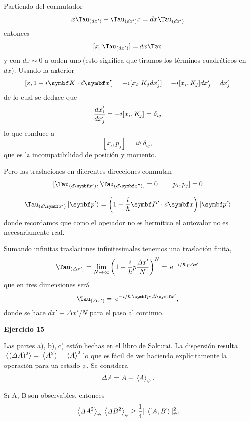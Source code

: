 \documentclass[10pt,oneside]{CBFT_book}
\begin{document}
Partiendo del conmutador 
\[
	x \Tau_{(dx')} - \Tau_{(dx')} x = dx \Tau_{(dx')}
\]
entonces 
\[
	[x, \Tau_{(dx')}] = dx\Tau 
\]
y con $dx\sim 0$ a orden uno (esto significa que tiramos los términos cuadráticos en $dx$).
Usando la anterior
\[
	[x, 1 - i \vb K \cdot d\vb{x'} ] = -i [ x_i, K_j dx_j' ] = 
	-i [ x_i, K_j ] dx_j' =  dx_j'
\]
de lo cual se deduce que
\[
	\frac{d^{\hspace{-0.05em}} {x_i'}}{d {x_j'}^{\hspace{-0.05em}}} = - i [ x_i , K_j ] = \delta_{ij}
\]
lo que conduce a 
\[
	[ x_i, p_j ] = i \hbar \:\delta_{ij},
\]
que es la incompatibilidad de posición y momento.

Pero las traslaciones en diferentes direcciones conmutan
\[
	[ \Tau_{(d\vb{x}')}, \Tau_{(d\vb{x}'')} ] = 0  \qquad [ p_i, p_j ] = 0
\]
	
\[
	\Tau_{(d\vb{x}')} \Ket{\vb{p'}} = 
	\left( 1 - \frac{i}{\hbar} \vb{P'}\cdot d\vb{x} \right) \Ket{\vb{p'}}
\]
donde recordamos que como el operador no es hermítico el autovalor no es 
necesariamente real.

Sumando infinitas traslaciones infinitesimales tenemos una traslación finita,
\[
	\Tau_{(\Delta x')} = \lim_{N\to \infty}
	\left( 1 - \frac{i}{\hbar}p\frac{\Delta x'}{N}\right)^N =
	\euler^{-i/\hbar \: p\Delta x'}
\]
que en tres dimensiones será 
\[
	\Tau_{(\Delta x')} = \euler^{-i/\hbar\: \vb{p}\cdot\Delta \vb{x}'},
\]
donde se hace $ dx' \equiv \Delta x'/N $ para el paso al continuo.

\begin{ejemplo}{\bf Ejercicio 15}

Las partes a), b), c) están hechas en el libro de Sakurai.
La dispersión resulta $\:\left\langle (\Delta A)^2 \right\rangle = \:\left\langle A^2 \right\rangle -\:\left\langle A \right\rangle^2$ lo que es fácil de
ver haciendo explícitamente la operación para un estado $\psi$.
Se considera
\[
	\Delta A = A - \:\left\langle A \right\rangle_\psi.
\]

Si A, B son observables, entonces
\[
	\:\left\langle \Delta A^2 \right\rangle_\psi \:\left\langle \Delta B^2 \right\rangle_\psi \geq \frac{1}{4} |\:\left\langle [A,B] \right\rangle|^2_\psi.
\]
 
\end{ejemplo}
\end{document}
